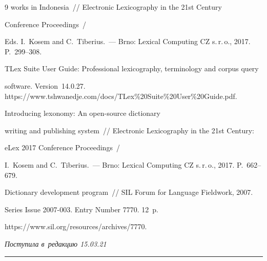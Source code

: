 {{\begin{thebibliography}{9}
works in Indonesia~/\!\!/ Electronic Lexicography in the 21st Century 

Conference Proceedings~/

Eds. I.~Kosem and C.~Tiberius.~--- Brno: Lexical Computing CZ s.\,r.\,o., 2017. P.~299--308.






TLex Suite User Guide: Professional lexicography, terminology and corpus query 

software. Version~14.0.27. {\sf https://www.tshwanedje.com/docs/TLex\%20Suite\linebreak \%20User\%20Guide.pdf}.


 Introducing lexonomy: An open-source dictionary 

writing and publishing system~/\!\!/ Electronic Lexicography in the 21st Century: 

eLex 2017 Conference Proceedings~/

I.~Kosem and C.~Tiberius.~--- Brno: Lexical Computing CZ s.\,r.\,o., 2017. P.~662--679.


 Dictionary development program~/\!\!/ SIL Forum for Language Fieldwork, 2007. 

Series Issue 2007-003. Entry Number 7770.  12~p.

{\sf https://www.sil.org/\linebreak resources/archives/7770}.

      \end{thebibliography}

} }







\vspace*{-3pt}



\hfill{\small\textit{Поступила в~редакцию 15.03.21}}









\vspace*{6pt}



\hrule



\vspace*{2pt}



